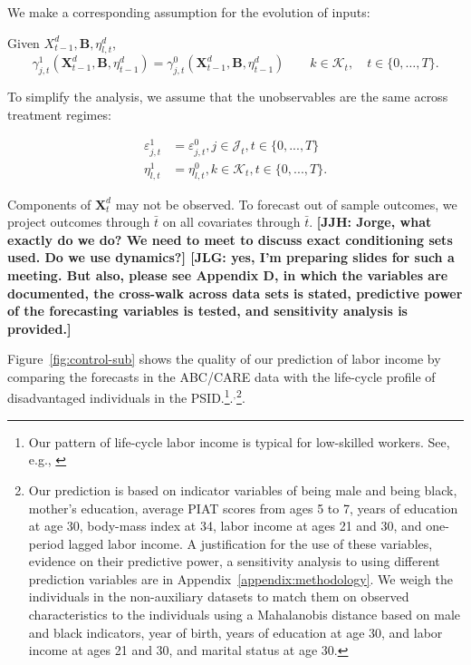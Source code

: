 We make a corresponding assumption for the evolution of inputs:
\addtocounter{assumption}{-1}
\renewcommand\theassumption{A--\arabic{assumption}(b)}
\begin{assumption}\label{ass:psoriasis}
Given $X^d_{t-1}, \bm{B}, \eta^d_{l,t}$,
\begin{equation*}
\gamma^1_{j,t} (\bm{X}^d_{t-1}, \bm{B}, \eta^d_{t-1}) = \gamma^0_{j,t} (\bm{X}^d_{t-1}, \bm{B}, \eta^d_{t-1}) \qquad k \in \mathcal{K}_t, \quad t \in \{0,\dots,T\}.
\end{equation*}
\end{assumption}
To simplify the analysis, we assume that the unobservables are the same across treatment regimes:

\renewcommand\theassumption{A--\arabic{assumption}}
\begin{assumption}\label{ass:fox}
\begin{align*}
\varepsilon^{1}_{j,t} &= \varepsilon^{0}_{j,t} , j \in \mathcal{J}_t, t \in \{ 0,..., T\} \\
\eta^{1}_{l,t} &= \eta^{0}_{l,t} , k \in \mathcal{K}_t, t \in \{0,...,T\}.
\end{align*}
\end{assumption}

Components of $\bm{X}^{d}_{t}$ may not be observed. To forecast out of sample outcomes, we project outcomes through $\bar{t}$ on all covariates through $\bar{t}$. \textbf{[JJH: Jorge, what exactly do we do? We need to meet to discuss exact conditioning sets used. Do we use dynamics?]  [JLG: yes, I'm preparing slides for such a meeting. But also, please see Appendix D, in which the variables are documented, the cross-walk across data sets is stated, predictive power of the forecasting variables is tested, and sensitivity analysis is provided.]}

Figure~\ref{fig:control-sub} shows the quality of our prediction of labor income by comparing the forecasts in the ABC/CARE data with the life-cycle profile of disadvantaged individuals in the PSID.\footnote{Our pattern of life-cycle labor income is typical for low-skilled workers. See, e.g., \cite{Blundell-etal_2015_J-Pub-E}}.$^{,}$\footnote{Our prediction is based on indicator variables of being male and being black, mother's education, average PIAT scores from ages 5 to 7, years of education at age 30, body-mass index at 34, labor income at ages 21 and 30, and one-period lagged labor income. A justification for the use of these variables, evidence on their predictive power, a sensitivity analysis to using different prediction variables are in Appendix~\ref{appendix:methodology}. We weigh the individuals in the non-auxiliary datasets to match them on observed characteristics to the individuals using a Mahalanobis distance based on male and black indicators, year of birth, years of education at age 30, and labor income at ages 21 and 30, and marital status at age 30.}.

